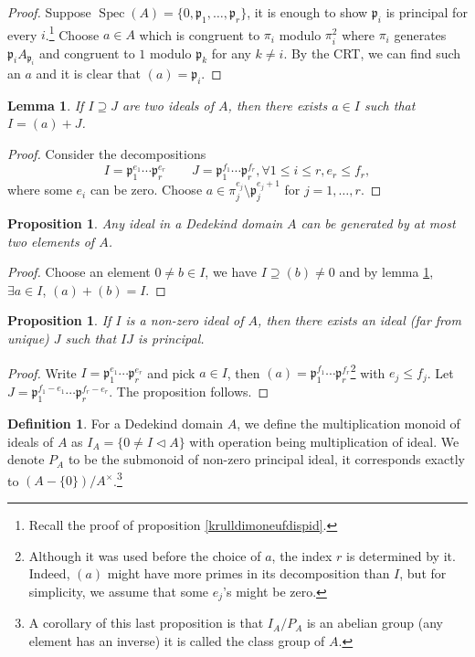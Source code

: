 \documentclass{tufte-handout} %
\newtheorem{prop}[thm]{Proposition}
\newtheorem{lem}[thm]{Lemma}
\theoremstyle{definition}
\newtheorem{defn}[thm]{Definition}
\theoremstyle{remark}
\newcommand{\lp}{{\mathfrak{p}}}
\DeclareMathOperator{\spec}{Spec}
\begin{document}
\begin{proof}
	Suppose $\spec(A) = \{0, \lp_1, \dots, \lp_r\}$, it is enough to show $\lp_i$ is principal for every $i$.\footnote{Recall the proof of proposition \ref{krulldimoneufdispid}.} Choose $a \in A$ which is congruent to $\pi_i$ modulo $\pi_i^2$ where $\pi_i$ generates $\lp_iA_{\lp_i}$ and congruent to $1$ modulo $\lp_k$ for any $k \neq i$. By the CRT, we can find such an $a$ and it is clear that $(a) = \lp_i$.%
\end{proof}
\begin{lem}\label{twoideals}
	If $I \supseteq J$ are two ideals of $A$, then there exists $a \in I$ such that $I = (a) + J$.
\end{lem}
\begin{proof}
	Consider the decompositions
	\[I = \lp_1^{e_1} \cdots \lp_r^{e_r} \quad \quad J = \lp_1^{f_1} \cdots \lp_r^{f_r}, \forall 1\leq i \leq r, e_r \leq f_r,\]
	where some $e_i$ can be zero. Choose $a \in \pi_j^{e_j} \setminus \lp_j^{e_j+1}$ for $j = 1,\dots, r$. %
\end{proof}

\begin{prop}
	Any ideal in a Dedekind domain $A$ can be generated by at most two elements of $A$.
\end{prop}
\begin{proof}
	Choose an element $0\neq b \in I$, we have $I \supseteq (b) \neq 0$ and by lemma \ref{twoideals}, $\exists a \in I$, $(a)+ (b) = I$.
\end{proof}
\begin{prop}
	If $I$ is a non-zero ideal of $A$, then there exists an ideal (far from unique) $J$ such that $IJ$ is principal.
\end{prop}
\begin{proof}
	Write $I = \lp_1^{e_1}\cdots \lp_r^{e_r}$ and pick $a \in I$, then $(a) = \lp_1^{f_1}\cdots \lp_r^{f_r}$\footnote{Although it was used before the choice of $a$, the index $r$ is determined by it. Indeed, $(a)$ might have more primes in its decomposition than $I$, but for simplicity, we assume that some $e_j$'s might be zero.} with $e_j\leq f_j$. Let $J = \lp_1^{f_1-e_1} \cdots \lp_r^{f_r-e_r}$. The proposition follows.
\end{proof}
\begin{defn}
	For a Dedekind domain $A$, we define the multiplication monoid of ideals of $A$ as $I_A = \{0 \neq I \lhd A\}$ with operation being multiplication of ideal. We denote $P_A$ to be the submonoid of non-zero principal ideal, it corresponds exactly to $(A-\{0\})/A^{\times}$.\footnote{A corollary of this last proposition is that $I_A/P_A$ is an abelian group (any element has an inverse) it is called the class group of $A$.}
\end{defn}
\end{document}
